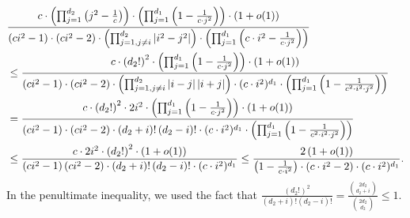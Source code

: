 \begin{align}
& \frac{c\cdot \left( \prod_{j=1}^{d_{2}}\left( j^{2}-\frac{1}{c}\right)
\right) \cdot \left( \prod_{j=1}^{d_{1}}\left( 1-\frac{1}{c\cdot j^{2}}
\right) \right) \cdot (1+o(1))}{\left( ci^{2}-1\right) \cdot \left(
ci^{2}-2\right) \cdot \left( \prod_{j=1,j\neq i}^{d_{2}}\left\vert
i^{2}-j^{2}\right\vert \right) \cdot \left( \prod_{j=1}^{d_{1}}\left( c\cdot
i^{2}-\frac{1}{c\cdot j^{2}}\right) \right) }  \notag \\
& \leq \frac{c\cdot \left( d_{2}!\right) ^{2}\cdot \left(
\prod_{j=1}^{d_{1}}\left( 1-\frac{1}{c\cdot j^{2}}\right) \right) \cdot
(1+o(1))}{\left( ci^{2}-1\right) \cdot \left( ci^{2}-2\right) \cdot \left(
\prod_{j=1,j\neq i}^{d_{2}}\left\vert i-j\right\vert \left\vert
i+j\right\vert \right) \cdot (c\cdot i^{2})^{d_{1}}\cdot \left(
\prod_{j=1}^{d_{1}}\left( 1-\frac{1}{c^{2}\cdot i^{2}\cdot j^{2}}\right)
\right) }  \notag \\
& =\frac{c\cdot \left( d_{2}!\right) ^{2}\cdot 2i^{2}\cdot \left(
\prod_{j=1}^{d_{1}}\left( 1-\frac{1}{c\cdot j^{2}}\right) \right) \cdot
(1+o(1))}{\left( ci^{2}-1\right) \cdot \left( ci^{2}-2\right) \cdot \left(
d_{2}+i\right) !\left( d_{2}-i\right) !\cdot (c\cdot i^{2})^{d_{1}}\cdot
\left( \prod_{j=1}^{d_{1}}\left( 1-\frac{1}{c^{2}\cdot i^{2}\cdot j^{2}}
\right) \right) }  \notag \\
& \leq \frac{c\cdot 2i^{2}\cdot \left( d_{2}!\right) ^{2}\cdot (1+o(1))}{
\left( ci^{2}-1\right) \left( ci^{2}-2\right) \cdot \left( d_{2}+i\right)
!\left( d_{2}-i\right) !\cdot (c\cdot i^{2})^{d_{1}}}\leq \frac{2\left(
1+o(1)\right) }{\left( 1-\frac{1}{c\cdot i^{2}}\right) \cdot (c\cdot
i^{2}-2)\cdot (c\cdot i^{2})^{d_{1}}}.  \label{verylongequation}
\end{align}
In the penultimate inequality, we used the fact that $\frac{(d_{2}!)^{2}}{
(d_{2}+i)!(d_{2}-i)!}=\frac{\binom{2d_{2}}{d_{2}+i}}{\binom{2d_{2}}{d_{2}}}
\leq 1$.

